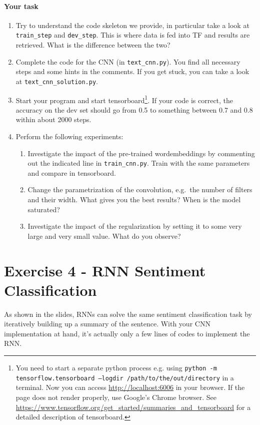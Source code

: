 \documentclass{article}
\begin{document}
\paragraph{Your task}
\begin{enumerate}
	\item Try to understand the code skeleton we provide, in particular take a look at \texttt{train\_step} and \texttt{dev\_step}. This is where data is fed into TF and results are retrieved. What is the difference between the two?
	\item Complete the code for the CNN (in \texttt{text\_cnn.py}). You find all necessary steps and some hints in the comments. If you get stuck, you can take a look at \texttt{text\_cnn\_solution.py}.
	\item Start your program and start tensorboard\footnote{You need to start a separate python process e.g. using \texttt{python -m tensorflow.tensorboard --logdir /path/to/the/out/directory} in a terminal. Now you can access \url{http://localhost:6006} in your browser. If the page does not render properly, use Google's Chrome browser. See \url{https://www.tensorflow.org/get_started/summaries_and_tensorboard} for a detailed description of tensorboard.}. If your code is correct, the accuracy on the dev set should go from 0.5 to something between 0.7 and 0.8 within about 2000 steps.
	\item Perform the following experiments:
	\begin{enumerate}
		\item Investigate the impact of the pre-trained wordembeddings by commenting out the indicated line in \texttt{train\_cnn.py}. Train with the same parameters and compare in tensorboard.
		\item Change the parametrization of the convolution, e.g.\ the number of filters and their width. What gives you the best results? When is the model saturated?
		\item Investigate the impact of the regularization by setting it to some very large and very small value. What do you observe?
\end{enumerate}	 
\end{enumerate}


\section*{Exercise 4 - RNN Sentiment Classification}

As shown in the slides, RNNs can solve the same sentiment classification task by iteratively building up a summary of the sentence. With your CNN implementation at hand, it's actually only a few lines of codes to implement the RNN.
\end{document}
